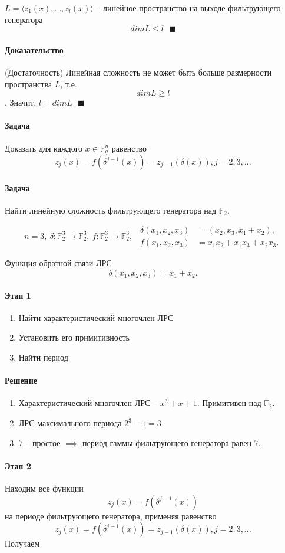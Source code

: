 \documentclass[a4paper,12pt]{article}
\newcommand{\proof}{\paragraph{Доказательство}}
\begin{document}
	$L = \langle z_1(x), ..., z_l(x) \rangle$ -- линейное пространство на выходе фильтрующего генератора \[ dim L \le l ~~~\blacksquare \]
	\proof (Достаточность)
	Линейная сложность не может быть больше размерности пространства $L$, т.е. \[ dim L \ge l \]. Значит, $l = dim L ~~~\blacksquare$
	\paragraph{Задача} Доказать для каждого $x \in \mathbb{F}_q^n$ равенство \[ z_j(x) = f(\delta^{j-1}(x)) = z_{j-1}(\delta(x)), j = 2,3,... \]
	\paragraph{Задача} Найти линейную сложность фильтрующего генератора над $\mathbb{F}_2$.
	
	$$
	n = 3, ~ \delta: \mathbb{F}_2^3 \rightarrow \mathbb{F}_2^3, ~ f: \mathbb{F}_2^3 \rightarrow \mathbb{F}_2^3, ~~
	\begin{aligned}
		\delta(x_1, x_2, x_3) &= (x_2, x_3, x_1 + x_2),\\
		f(x_1, x_2, x_3) &= x_1x_2 + x_1x_3 + x_2x_3.
	\end{aligned}
	$$
	
	Функция обратной связи ЛРС \[ b(x_1, x_2, x_3) = x_1 + x_2. \]
	\paragraph{Этап 1}
	\begin{enumerate}
	\item Найти характеристический многочлен ЛРС
	\item Установить его примитивность
	\item Найти период
	\end{enumerate}
	\paragraph{Решение}
	\begin{enumerate}
	\item Характеристический многочлен ЛРС -- $x^3 + x + 1$. Примитивен над $\mathbb{F}_2.$
	\item ЛРС максимального периода $2^3 - 1 = 3$
	\item $7$ -- простое $\implies$ период гаммы фильтрующего генератора равен $7$.
	\end{enumerate}
	\paragraph{Этап 2}
	Находим все функции \[ z_j(x) = f(\delta^{j-1}(x)) \] на периоде фильтрующего генератора, применяя равенство \[ z_j(x) = f(\delta^{j-1}(x)) = z_{j-1}(\delta(x)), j = 2,3,... \]
	Получаем
	
\end{document}
